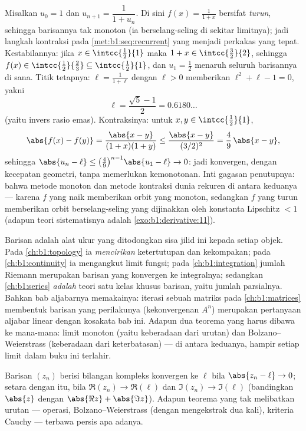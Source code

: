 \begin{example}\label{ex:b1:seq:golden}
Misalkan $u_0 = 1$ dan $u_{n+1} = \dfrac{1}{1 + u_n}$. Di sini $f(x) =
\frac{1}{1+x}$ bersifat \emph{turun}, sehingga barisannya tak
monoton (ia berselang-seling di sekitar limitnya); jadi langkah kontraksi
pada \cref{met:b1:seq:recurrent} yang menjadi perkakas yang tepat. Kestabilannya: jika
$x \in \intcc{\frac12}{1}$ maka $1 + x \in
\intcc{\frac32}{2}$, sehingga $f(x) \in \intcc{\frac12}{\frac23}
\subseteq \intcc{\frac12}{1}$, dan $u_1 = \frac12$ menaruh
seluruh barisannya di sana. Titik tetapnya: $\ell = \frac{1}{1+\ell}$
dengan $\ell > 0$ memberikan $\ell^2 + \ell - 1 = 0$, yakni
\[
\ell = \frac{\sqrt5 - 1}{2} = 0.6180\dots
\]
(yaitu invers rasio emas). Kontraksinya: untuk $x, y \in
\intcc{\frac12}{1}$,
\[
\abs{f(x) - f(y)} = \frac{\abs{x - y}}{(1+x)(1+y)}
\leq \frac{\abs{x-y}}{(3/2)^2} = \frac49\,\abs{x - y} ,
\]
sehingga $\abs{u_n - \ell} \leq \bigl(\frac49\bigr)^{n-1}\abs{u_1 -
\ell} \to 0$: jadi konvergen, dengan kecepatan geometri, tanpa
memerlukan kemonotonan. Inti gagasan penutupnya: bahwa metode monoton dan
metode kontraksi  dunia rekuren di antara keduanya ---
karena $f$ yang naik memberikan orbit yang monoton, sedangkan $f$ yang turun memberikan
orbit berselang-seling yang dijinakkan oleh konstanta Lipschitz $< 1$ (adapun
teori sistematisnya adalah \cref{exo:b1:derivative:11}).
\end{example}

\begin{remark}
Barisan adalah alat ukur yang ditodongkan sisa jilid ini
kepada setiap objek. Pada \cref{ch:b1:topology} ia
\emph{mencirikan} ketertutupan dan kekompakan; pada
\cref{ch:b1:continuity} ia mengangkut limit fungsi; pada
\cref{ch:b1:integration} jumlah Riemann merupakan barisan yang konvergen
ke integralnya; sedangkan \cref{ch:b1:series} \emph{adalah} teori satu
kelas khusus barisan, yaitu jumlah parsialnya. Bahkan bab aljabarnya
memakainya: iterasi sebuah matriks pada
\cref{ch:b1:matrices} membentuk barisan yang perilakunya
(kekonvergenan $A^n$) merupakan pertanyaan aljabar linear dengan
kosakata bab ini. Adapun dua teorema yang harus dibawa ke mana-mana:
limit monoton (yaitu keberadaan dari urutan) dan Bolzano--Weierstrass
(keberadaan dari keterbatasan) --- di antara keduanya, hampir setiap
limit dalam buku ini terlahir.
\end{remark}

\begin{remark}
Barisan $(z_n)$ berisi bilangan kompleks konvergen ke $\ell$ bila
$\abs{z_n - \ell} \to 0$; setara dengan itu, bila $\Re(z_n) \to \Re(\ell)$
dan $\Im(z_n) \to \Im(\ell)$ (bandingkan $\abs{z}$ dengan $\abs{\Re z} +
\abs{\Im z}$). Adapun teorema yang tak melibatkan urutan --- operasi,
Bolzano--Weierstrass (dengan mengekstrak dua kali), kriteria Cauchy --- terbawa
persis apa adanya.
\end{remark}

